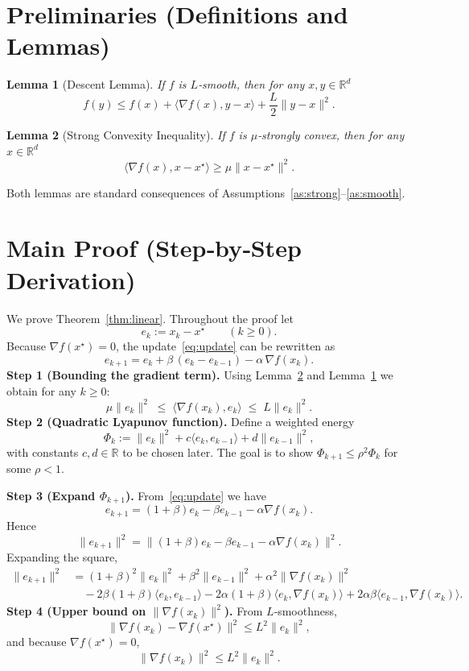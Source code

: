 \documentclass[12pt]{article}
\newtheorem{lemma}{Lemma}
\newcommand{\R}{\mathbb{R}}
\begin{document}
\section*{Preliminaries (Definitions and Lemmas)}
\begin{lemma}[Descent Lemma]\label{lem:descent}
If $f$ is $L$‑smooth, then for any $x,y\in\R^{d}$
\[
f(y)\le f(x)+\langle\nabla f(x),y-x\rangle+\frac{L}{2}\|y-x\|^{2}.
\]
\end{lemma}
\begin{lemma}[Strong Convexity Inequality]\label{lem:strong}
If $f$ is $\mu$‑strongly convex, then for any $x\in\R^{d}$
\[
\langle\nabla f(x),x-x^{\star}\rangle\ge \mu\|x-x^{\star}\|^{2}.
\]
\end{lemma}
Both lemmas are standard consequences of Assumptions~\ref{as:strong}–\ref{as:smooth}.

\section*{Main Proof (Step‑by‑Step Derivation)}
We prove Theorem~\ref{thm:linear}.  Throughout the proof let
\[
e_k:=x_k-x^{\star}\qquad(k\ge 0).
\]
Because $\nabla f(x^{\star})=0$, the update~\eqref{eq:update} can be rewritten as
\[
e_{k+1}=e_k+\beta\,(e_k-e_{k-1})-\alpha\,\nabla f(x_k).
\tag{1}
\]
\noindent\textbf{Step 1 (Bounding the gradient term).}  
Using Lemma~\ref{lem:strong} and Lemma~\ref{lem:descent} we obtain for any $k\ge0$:
\[
\mu\|e_k\|^{2}\;\le\;\langle\nabla f(x_k),e_k\rangle
\;\le\;L\|e_k\|^{2}.
\tag{2}
\]
\noindent\textbf{Step 2 (Quadratic Lyapunov function).}  
Define a weighted energy
\[
\Phi_k:=\|e_k\|^{2}+c\langle e_k,e_{k-1}\rangle+d\|e_{k-1}\|^{2},
\tag{3}
\]
with constants $c,d\in\R$ to be chosen later.  The goal is to show
$\Phi_{k+1}\le\rho^{2}\Phi_k$ for some $\rho<1$.

\noindent\textbf{Step 3 (Expand $\Phi_{k+1}$).}  
From~\eqref{eq:update} we have
\[
e_{k+1}= (1+\beta)e_k-\beta e_{k-1}-\alpha\nabla f(x_k).
\tag{4}
\]
Hence
\[
\|e_{k+1}\|^{2}= \|(1+\beta)e_k-\beta e_{k-1}-\alpha\nabla f(x_k)\|^{2}.
\tag{5}
\]
Expanding the square,
\begin{align}
\|e_{k+1}\|^{2}
&=(1+\beta)^{2}\|e_k\|^{2}+\beta^{2}\|e_{k-1}\|^{2}
+\alpha^{2}\|\nabla f(x_k)\|^{2} \nonumber\\
&\quad -2\beta(1+\beta)\langle e_k,e_{k-1}\rangle
-2\alpha(1+\beta)\langle e_k,\nabla f(x_k)\rangle
+2\alpha\beta\langle e_{k-1},\nabla f(x_k)\rangle .
\tag{6}
\end{align}
\noindent\textbf{Step 4 (Upper bound on $\|\nabla f(x_k)\|^{2}$).}  
From $L$‑smoothness,
\[
\|\nabla f(x_k)-\nabla f(x^{\star})\|^{2}\le L^{2}\|e_k\|^{2},
\]
and because $\nabla f(x^{\star})=0$,
\[
\|\nabla f(x_k)\|^{2}\le L^{2}\|e_k\|^{2}.
\tag{7}
\]
\end{document}
